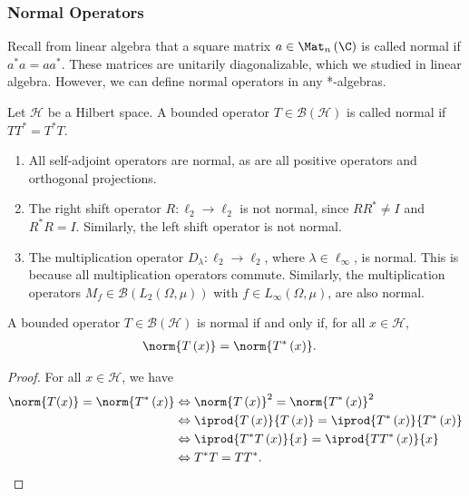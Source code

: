 \documentclass[10pt]{mypackage}
\begin{document}
\subsubsection{Normal Operators}%
Recall from linear algebra that a square matrix $a\in \Mat_{n}\left(\C\right)$ is called normal if $a^{\ast}a = aa^{\ast}$. These matrices are unitarily diagonalizable, which we studied in linear algebra. However, we can define normal operators in any *-algebras.
\begin{definition}
  Let $\mathcal{H}$ be a Hilbert space. A bounded operator $T\in \mathcal{B}\left(\mathcal{H}\right)$ is called normal if $TT^{\ast} = T^{\ast}T$.
\end{definition}
\begin{example}\hfill
  \begin{enumerate}[(1)]
    \item All self-adjoint operators are normal, as are all positive operators and orthogonal projections.
    \item The right shift operator $R: \ell_2\rightarrow \ell_2$ is not normal, since $RR^{\ast} \neq I$ and $R^{\ast}R = I$. Similarly, the left shift operator is not normal.
    \item The multiplication operator $D_{\lambda}:\ell_2\rightarrow \ell_2$, where $\lambda \in \ell_{\infty}$, is normal. This is because all multiplication operators commute. Similarly, the multiplication operators $M_{f}\in \mathcal{B}\left(L_{2}\left(\Omega,\mu\right)\right)$ with $f\in L_{\infty}\left(\Omega,\mu\right)$, are also normal.
  \end{enumerate}
\end{example}
\begin{lemma}
  A bounded operator $T\in \mathcal{B}\left(\mathcal{H}\right)$ is normal if and only if, for all $x\in \mathcal{H}$,
  \begin{align*}
    \norm{T\left(x\right)} &= \norm{T^{\ast}\left(x\right)}.
  \end{align*}
\end{lemma}
\begin{proof}
  For all $x\in \mathcal{H}$, we have
  \begin{align*}
    \norm{T(x)} = \norm{T^{\ast}\left(x\right)} &\Leftrightarrow \norm{T\left(x\right)}^2 = \norm{T^{\ast}\left(x\right)}^2\\
                                                &\Leftrightarrow \iprod{T\left(x\right)}{T\left(x\right)} = \iprod{T^{\ast}\left(x\right)}{T^{\ast}\left(x\right)}\\
                                                &\Leftrightarrow \iprod{T^{\ast}T\left(x\right)}{x} = \iprod{TT^{\ast}\left(x\right)}{x}\\
                                                &\Leftrightarrow T^{\ast}T = TT^{\ast}.
  \end{align*}
\end{proof}
\end{document}
